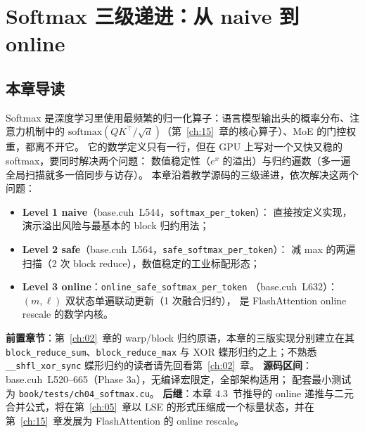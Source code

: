 \chapter{Softmax 三级递进：从 naive 到 online}\label{ch:04}

\section{本章导读}

Softmax 是深度学习里使用最频繁的归一化算子：语言模型输出头的概率分布、注意力机制中的
$\mathrm{softmax}(QK^{\top}/\sqrt{d})$（第~\ref{ch:15}~章的核心算子）、MoE 的门控权重，都离不开它。
它的数学定义只有一行，但在 GPU 上写对一个又快又稳的 softmax，要同时解决两个问题：
数值稳定性（$e^{x}$ 的溢出）与归约遍数（多一遍全局扫描就多一倍同步与访存）。
本章沿着教学源码的三级递进，依次解决这两个问题：

\begin{itemize}
  \item \textbf{Level 1 naive}（base.cuh~L544，\texttt{softmax\_\allowbreak{}per\_\allowbreak{}token}）：
        直接按定义实现，演示溢出风险与最基本的 block 归约用法；
  \item \textbf{Level 2 safe}（base.cuh~L564，\texttt{safe\_\allowbreak{}softmax\_\allowbreak{}per\_\allowbreak{}token}）：
        减 max 的两遍扫描（2 次 block reduce），数值稳定的工业标配形态；
  \item \textbf{Level 3 online}：\texttt{online\_\allowbreak{}safe\_\allowbreak{}softmax\_\allowbreak{}per\_\allowbreak{}token}
        （base.cuh~L632）：$(m,\ell)$ 双状态单遍联动更新（1 次融合归约），
        是 FlashAttention online rescale 的数学内核。
\end{itemize}

\textbf{前置章节}：第~\ref{ch:02}~章的 warp/block 归约原语，本章的三版实现分别建立在其
\texttt{block\_\allowbreak{}reduce\_\allowbreak{}sum}、\allowbreak\texttt{block\_\allowbreak{}reduce\_\allowbreak{}max} 与 XOR 蝶形归约之上；不熟悉
\texttt{\_\allowbreak{}\_\allowbreak{}shfl\_\allowbreak{}xor\_\allowbreak{}sync}
蝶形归约的读者请先回看第~\ref{ch:02}~章。
\textbf{源码区间}：base.cuh~L520--665（Phase 3a），无编译宏限定，全部架构适用；
配套最小测试为 \texttt{book/\allowbreak{}tests/\allowbreak{}ch04\_\allowbreak{}softmax.\allowbreak{}cu}。
\textbf{后继}：本章 4.3~节推导的 online 递推与二元合并公式，将在第~\ref{ch:05}~章以
LSE 的形式压缩成一个标量状态，并在第~\ref{ch:15}~章发展为 FlashAttention 的
online rescale。

